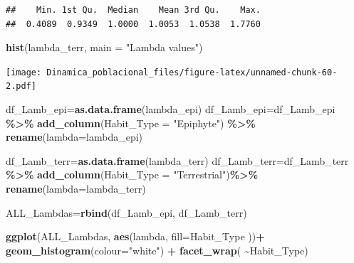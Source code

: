 \documentclass[
]{book}
\newenvironment{Shaded}{\begin{snugshade}}{\end{snugshade}}
\newcommand{\AttributeTok}[1]{\textcolor[rgb]{0.13,0.29,0.53}{#1}}
\newcommand{\FunctionTok}[1]{\textcolor[rgb]{0.13,0.29,0.53}{\textbf{#1}}}
\newcommand{\NormalTok}[1]{#1}
\newcommand{\OtherTok}[1]{\textcolor[rgb]{0.56,0.35,0.01}{#1}}
\newcommand{\SpecialCharTok}[1]{\textcolor[rgb]{0.81,0.36,0.00}{\textbf{#1}}}
\newcommand{\StringTok}[1]{\textcolor[rgb]{0.31,0.60,0.02}{#1}}
\theoremstyle{definition}
\theoremstyle{definition}
\theoremstyle{definition}
\theoremstyle{definition}
\theoremstyle{remark}
\begin{document}
\begin{verbatim}
##    Min. 1st Qu.  Median    Mean 3rd Qu.    Max. 
##  0.4089  0.9349  1.0000  1.0053  1.0538  1.7760
\end{verbatim}

\begin{Shaded}
\begin{Highlighting}[]
\FunctionTok{hist}\NormalTok{(lambda\_terr, }\AttributeTok{main =} \StringTok{"Lambda values"}\NormalTok{)}
\end{Highlighting}
\end{Shaded}

\texttt{[image: Dinamica\_poblacional\_files/figure-latex/unnamed-chunk-60-2.pdf]}

\begin{Shaded}
\begin{Highlighting}[]
\NormalTok{df\_Lamb\_epi}\OtherTok{=}\FunctionTok{as.data.frame}\NormalTok{(lambda\_epi)}
\NormalTok{df\_Lamb\_epi}\OtherTok{=}\NormalTok{df\_Lamb\_epi }\SpecialCharTok{\%\textgreater{}\%} 
  \FunctionTok{add\_column}\NormalTok{(}\AttributeTok{Habit\_Type =} \StringTok{"Epiphyte"}\NormalTok{) }\SpecialCharTok{\%\textgreater{}\%} 
  \FunctionTok{rename}\NormalTok{(}\AttributeTok{lambda=}\NormalTok{lambda\_epi)}


\NormalTok{df\_Lamb\_terr}\OtherTok{=}\FunctionTok{as.data.frame}\NormalTok{(lambda\_terr)}
\NormalTok{df\_Lamb\_terr}\OtherTok{=}\NormalTok{df\_Lamb\_terr }\SpecialCharTok{\%\textgreater{}\%} 
  \FunctionTok{add\_column}\NormalTok{(}\AttributeTok{Habit\_Type =} \StringTok{"Terrestrial"}\NormalTok{)}\SpecialCharTok{\%\textgreater{}\%} 
  \FunctionTok{rename}\NormalTok{(}\AttributeTok{lambda=}\NormalTok{lambda\_terr)}


\NormalTok{ALL\_Lambdas}\OtherTok{=}\FunctionTok{rbind}\NormalTok{(df\_Lamb\_epi, df\_Lamb\_terr)}
\end{Highlighting}
\end{Shaded}

\begin{Shaded}
\begin{Highlighting}[]
\FunctionTok{ggplot}\NormalTok{(ALL\_Lambdas, }\FunctionTok{aes}\NormalTok{(lambda, }\AttributeTok{fill=}\NormalTok{Habit\_Type ))}\SpecialCharTok{+}
  \FunctionTok{geom\_histogram}\NormalTok{(}\AttributeTok{colour=}\StringTok{"white"}\NormalTok{) }\SpecialCharTok{+} 
  \FunctionTok{facet\_wrap}\NormalTok{( }\SpecialCharTok{\textasciitilde{}}\NormalTok{Habit\_Type)}
\end{Highlighting}
\end{Shaded}
\end{document}
